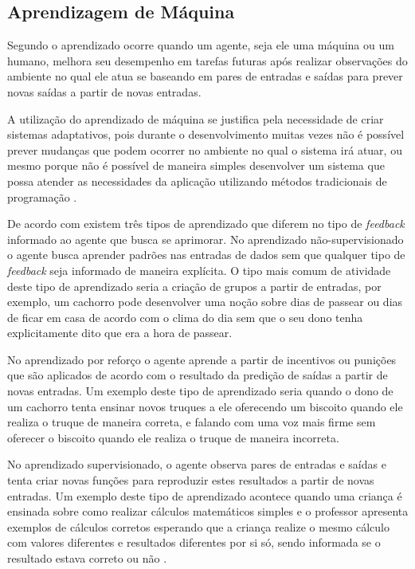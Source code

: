 \subsection{Aprendizagem de Máquina}

Segundo  o aprendizado ocorre quando um agente, seja ele uma máquina ou um humano, melhora seu desempenho em tarefas futuras após realizar observações do ambiente no qual ele atua se baseando em pares de entradas e saídas para prever novas saídas a partir de novas entradas.

A utilização do aprendizado de máquina se justifica pela necessidade de criar sistemas adaptativos, pois durante o desenvolvimento muitas vezes não é possível prever mudanças que podem ocorrer no ambiente no qual o sistema irá atuar, ou mesmo porque não é possível de maneira simples desenvolver um sistema que possa atender as necessidades da aplicação utilizando métodos tradicionais de programação \cite{norvig:780391}.

De acordo com  existem três tipos de aprendizado que diferem no tipo de \textit{feedback} informado ao agente que busca se aprimorar. No aprendizado não-supervisionado o agente busca aprender padrões nas entradas de dados sem que qualquer tipo de \textit{feedback} seja informado de maneira explícita. O tipo mais comum de atividade deste tipo de aprendizado seria a criação de grupos a partir de entradas, por exemplo, um cachorro pode desenvolver uma noção sobre dias de passear ou dias de ficar em casa de acordo com o clima do dia sem que o seu dono tenha explicitamente dito que era a hora de passear.

No aprendizado por reforço o agente aprende a partir de incentivos ou punições que são aplicados de acordo com o resultado da predição de saídas a partir de novas entradas. Um exemplo deste tipo de aprendizado seria quando o dono de um cachorro tenta ensinar novos truques a ele oferecendo um biscoito quando ele realiza o truque de maneira correta, e falando com uma voz mais firme sem oferecer o biscoito quando ele realiza o truque de maneira incorreta. \cite{norvig:780391}

No aprendizado supervisionado, o agente observa pares de entradas e saídas e tenta criar novas funções para reproduzir estes resultados a partir de novas entradas. Um exemplo deste tipo de aprendizado acontece quando uma criança é ensinada sobre como realizar cálculos matemáticos simples e o professor apresenta exemplos de cálculos corretos esperando que a criança realize o mesmo cálculo com valores diferentes e resultados diferentes por si só, sendo informada se o resultado estava correto ou não \cite{norvig:780391}.


